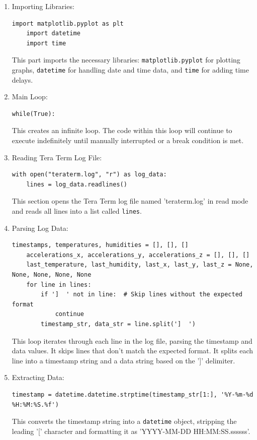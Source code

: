 \begin{enumerate}
    \item Importing Libraries:
    \begin{lstlisting}[caption={Import Libraries}]
    import matplotlib.pyplot as plt
    import datetime
    import time
    \end{lstlisting}
    This part imports the necessary libraries: \lstinline{matplotlib.pyplot} for plotting graphs, \lstinline{datetime} for handling date and time data, and \lstinline{time} for adding time delays.
    \item Main Loop:
    \begin{lstlisting}[caption={Main Loop}]
    while(True):
    \end{lstlisting}
    This creates an infinite loop. The code within this loop will continue to execute indefinitely until manually interrupted or a break condition is met.
    \item Reading Tera Term Log File:
    \begin{lstlisting}[caption={Reading Tera Term Log File}]
    with open("teraterm.log", "r") as log_data:
    lines = log_data.readlines()
    \end{lstlisting}
    This section opens the Tera Term log file named 'teraterm.log' in read mode and reads all lines into a list called \lstinline{lines}.
    \item Parsing Log Data:
    \begin{lstlisting}[caption={Parsing Log Data}]
    timestamps, temperatures, humidities = [], [], []
    accelerations_x, accelerations_y, accelerations_z = [], [], []
    last_temperature, last_humidity, last_x, last_y, last_z = None, None, None, None, None
    for line in lines:
        if ']  ' not in line:  # Skip lines without the expected format
            continue
        timestamp_str, data_str = line.split(']  ')
    \end{lstlisting}
    This loop iterates through each line in the log file, parsing the timestamp and data values. It skips lines that don't match the expected format.
    It splits each line into a timestamp string and a data string based on the ']' delimiter.
    \item Extracting Data:
    \begin{lstlisting}[caption={Extracting Data}]
    timestamp = datetime.datetime.strptime(timestamp_str[1:], '%Y-%m-%d %H:%M:%S.%f')
    \end{lstlisting}
    This converts the timestamp string into a \lstinline{datetime} object, stripping the leading '[' character and formatting it as 'YYYY-MM-DD HH:MM:SS.ssssss'.

\end{enumerate}

